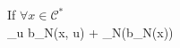 \documentclass[preview]{standalone}
\begin{document}
\begin{center}
{If $\forall x \in \mathcal{C}^*$\\\sup_{u \in {}}} \dot b_N(x, u) + \alpha_N(b_N(x)) 
\end{center}
\end{document}

